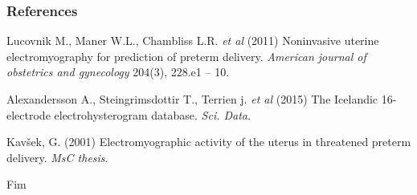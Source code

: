 \documentclass{beamer}
\begin{document}
\begin{frame}
	\frametitle{References}
	\footnotesize{
		\begin{thebibliography}{99} %
						
			 Lucovnik M., Maner W.L., Chambliss L.R. {\em et al} (2011)
			\newblock Noninvasive uterine electromyography for prediction of preterm delivery.
			\newblock \emph{American journal of obstetrics and gynecology} 204(3),  228.e1 -- 10.
			
			 Alexandersson A., Steingrimsdottir T., Terrien j. {\em et al} (2015)
			\newblock The Icelandic 16-electrode electrohysterogram database.
			\newblock \emph{Sci. Data}.
			
			 Kavšek, G. (2001)
			\newblock Electromyographic activity of the uterus in threatened preterm delivery.
			\newblock \emph{MsC thesis}.
			
			
		\end{thebibliography}
	}
\end{frame}


\begin{frame}
\Huge{\centerline{Fim}}
\end{frame}

\end{document}

